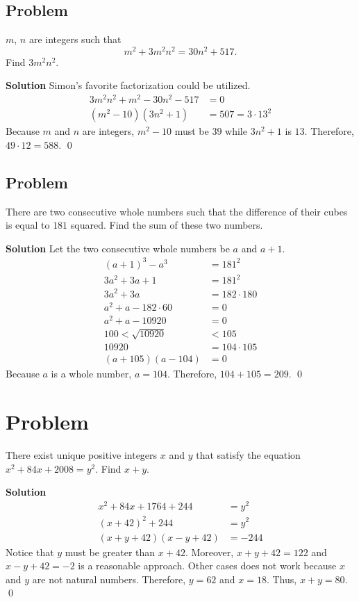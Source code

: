 \documentclass{article}
\newenvironment{solution}{\begin{trivlist}\item[]{\bf Solution}}{\qed \end{trivlist}}
\begin{document}
\subsection*{Problem}
$m$, $n$ are integers such that
\[
m^2 + 3m^2n^2 = 30n^2 + 517.
\]
Find $3m^2n^2$.

\begin{solution}
Simon's favorite factorization could be utilized.
\begin{align*}
    3m^2n^2 + m^2 - 30n^2 - 517 &= 0 \\
    (m^2 - 10)(3n^2 + 1) &= 507 = 3 \cdot 13^2
\end{align*}
Because $m$ and $n$ are integers, $m^2 - 10$ must be
$39$ while $3n^2 + 1$ is $13$. Therefore,
$49 \cdot 12 = \boxed{588}$.
\end{solution}

\subsection*{Problem}
There are two consecutive whole numbers such that
the difference of their cubes is equal to $181$ squared.
Find the sum of these two numbers.

\begin{solution}
Let the two consecutive whole numbers be $a$ and $a + 1$.
\begin{align*}
    (a + 1)^3 - a^3 &= 181^2 \\
    3a^2 + 3a + 1 &= 181^2 \\
    3a^2 + 3a &= 182 \cdot 180 \\
    a^2 + a - 182 \cdot 60 &= 0 \\
    a^2 + a - 10920 &= 0 \\
    100 < \sqrt{10920} &< 105 \\
    10920 &= 104 \cdot 105 \\
    (a + 105)(a - 104) &= 0
\end{align*}
Because $a$ is a whole number, $a = 104$.
Therefore, $104 + 105 = \boxed{209}$.
\end{solution}

\section*{Problem}
There exist unique positive integers $x$ and $y$ that
satisfy the equation $x^2 + 84x + 2008 = y^2$. Find $x + y$.

\begin{solution}
\begin{align*}
    x^2 + 84x + 1764 + 244 &= y^2 \\
    (x + 42)^2 + 244 &= y^2 \\
    (x + y + 42)(x - y + 42) &= -244
\end{align*}
Notice that $y$ must be greater than $x + 42$.
Moreover, $x + y + 42 = 122$ and $x - y + 42 = -2$
is a reasonable approach. Other cases does not work
because $x$ and $y$ are not natural numbers. Therefore,
$y = 62$ and $x = 18$. Thus, $x + y = \boxed{80}$.
\end{solution}
\end{document}
